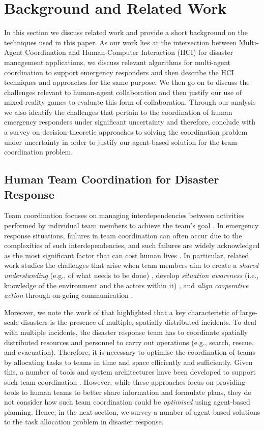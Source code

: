 \section{Background and Related Work}\label{sec:relatedwork}
In this section we discuss related work and provide a short background on the techniques used in this paper.  As our work lies at the intersection between Multi-Agent Coordination and Human-Computer Interaction (HCI) for disaster management applications, we discuss relevant algorithms for multi-agent coordination to support emergency responders and then describe the HCI techniques and approaches for the same purpose. We then go on to discuss the challenges relevant to human-agent collaboration and then justify our use of mixed-reality games to evaluate this form of collaboration.  Through our analysis we also identify the challenges that pertain to the coordination of human emergency responders under significant uncertainty and therefore, conclude with a survey on decision-theoretic approaches to solving the coordination problem under uncertainty in order to justify our agent-based solution for the team coordination problem.
\subsection{Human Team Coordination for Disaster Response}
Team coordination focuses on managing interdependencies between activities performed  by individual team members to achieve the team's goal \cite{Malone1990}. In emergency response situations, failures in team coordination can often occur due to the complexities of such interdependencies, and such failures are widely acknowledged as the most significant factor that can cost human lives \cite[p. 2]{Toups2011}. In particular, related work studies the challenges that arise when team members aim to create a \emph{shared understanding} (e.g., of what needs to be done) \cite{Convertino2011}, develop \emph{situation awareness} (i.e., knowledge of the environment and the actors within it) \cite{bader2008digital}, and \emph{align cooperative action} through on-going communication \cite{Toups2011}.

Moreover, we note the work of \cite{chen2005} that highlighted that a key characteristic of large-scale disasters is the presence of multiple, spatially distributed incidents. To deal with multiple incidents, the disaster response team has to coordinate spatially distributed resources and personnel to carry out operations (e.g., search, rescue, and evacuation). Therefore, it is necessary to optimise the coordination of teams by allocating tasks to teams in time and space efficiently and sufficiently. Given this, a number of tools and system architectures have been developed to support such team coordination \cite{Monares2011,Padilha2010,Convertino2011}. However, while these approaches focus on providing tools to human teams to better share  information and formulate plans,  they do not consider how such team coordination could be \emph{optimised} using agent-based planning. Hence, in the next section, we  survey a number of agent-based solutions to the task allocation problem in disaster response.

